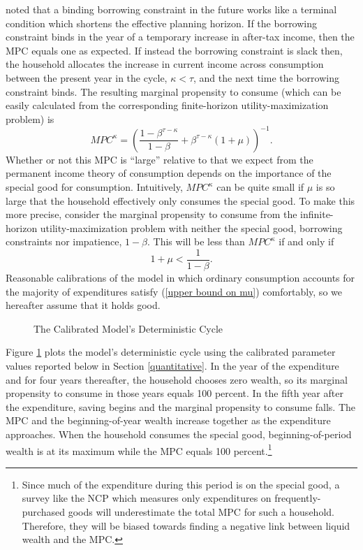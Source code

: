\documentclass[fleqccn,12pt]{article}
\begin{document}
\cite{mit1984Zeldes} noted that a binding borrowing constraint in the future works like a terminal condition which shortens the effective planning horizon.  If the borrowing constraint binds in the year of a temporary increase in after-tax income, then the MPC equals one as expected. If instead the borrowing constraint is slack then, the household allocates the increase in current income across consumption between the present year in the cycle, $\kappa<\tau$, and the next time the borrowing constraint binds. The resulting marginal propensity to consume (which can be easily calculated from the corresponding finite-horizon utility-maximization problem) is
\[
MPC^{\kappa }=\left( \frac{1-\beta ^{\tau -\kappa }}{1-\beta }+\beta ^{\tau
-\kappa }(1+\mu )\right) ^{-1}.
\]
Whether or not this MPC is ``large'' relative to that we expect from the permanent income theory of consumption depends on the importance of the special good for consumption. Intuitively, $MPC^\kappa$ can be quite small if $\mu$ is so large that the household effectively only consumes the special good. To make this more precise, consider the marginal propensity to consume from the infinite-horizon utility-maximization problem with neither the special good, borrowing constraints nor impatience, $1-\beta$. This will be less than $MPC^\kappa$ if and only if
\begin{equation}
\label{upper bound on mu}
1+\mu<\frac{1}{1-\beta }.
\end{equation}
Reasonable calibrations of the model in which ordinary consumption accounts for the majority of expenditures satisfy (\ref{upper bound on mu}) comfortably, so we hereafter assume that it holds good.

\begin{figure}
\begin{center}
\caption{The Calibrated Model's Deterministic Cycle\label{nonstochasticCycle}}
\end{center}
\end{figure}

Figure \ref{nonstochasticCycle} plots the model's deterministic cycle using the calibrated parameter values reported below in Section \ref{quantitative}. In the year of the expenditure and for four years thereafter, the household chooses zero wealth, so its marginal propensity to consume in those years equals 100 percent. In the fifth year after the expenditure, saving begins and the marginal propensity to consume falls. The MPC and the beginning-of-year wealth increase together as the expenditure approaches. When the household consumes the special good, beginning-of-period wealth is at its maximum while the MPC equals 100 percent.\footnote{Since much of the expenditure during this period is on the special good, a survey like the NCP which measures only expenditures on frequently-purchased goods will underestimate the total MPC for such a household. Therefore, they will be biased towards finding a negative link between liquid wealth and the MPC.} 
\end{document}
